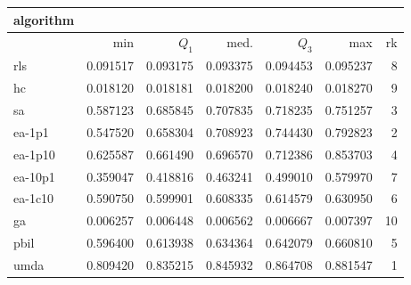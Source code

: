 \begin{tabular}{@{}l*{5}{>{{}}N{1}{3}}>{{}}N{2}{0}@{}}
\toprule
{algorithm} &  \\
\midrule
& {min} & {$Q_1$} & {med.} & {$Q_3$} & {max} & {rk}\\
\midrule
rls & 0.091517 & 0.093175 & 0.093375 & 0.094453 & 0.095237 & 8\\
hc & 0.018120 & 0.018181 & 0.018200 & 0.018240 & 0.018270 & 9\\
sa & 0.587123 & 0.685845 & 0.707835 & 0.718235 & 0.751257 & 3\\
ea-1p1 & 0.547520 & 0.658304 & 0.708923 & 0.744430 & 0.792823 & 2\\
ea-1p10 & 0.625587 & 0.661490 & 0.696570 & 0.712386 & 0.853703 & 4\\
ea-10p1 & 0.359047 & 0.418816 & 0.463241 & 0.499010 & 0.579970 & 7\\
ea-1c10 & 0.590750 & 0.599901 & 0.608335 & 0.614579 & 0.630950 & 6\\
ga & 0.006257 & 0.006448 & 0.006562 & 0.006667 & 0.007397 & 10\\
pbil & 0.596400 & 0.613938 & 0.634364 & 0.642079 & 0.660810 & 5\\
umda & {\color{blue}} 0.809420 & {\color{blue}} 0.835215 & {\color{blue}} 0.845932 & {\color{blue}} 0.864708 & {\color{blue}} 0.881547 & 1\\
\bottomrule
\end{tabular}
